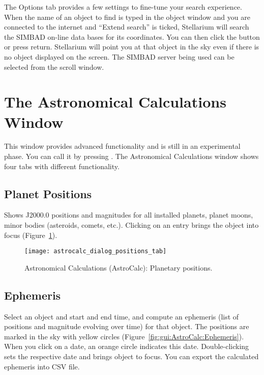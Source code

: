 The Options tab provides a few settings to fine-tune your search experience.
When the name of an object to find is typed in the object
window and you are connected to the internet and ``Extend search'' is
ticked, Stellarium will search the SIMBAD on-line  data bases for its
coordinates. You can then click the  button or press return.
Stellarium will point you at that object in the sky even if there is no
object displayed on the screen. The SIMBAD server being used can be
selected from the scroll window.


\section{The Astronomical Calculations Window}
\label{sec:gui:AstroCalc}

 This window provides advanced functionality and is
still in an experimental phase. You can call it by pressing . The Astronomical Calculations window shows four tabs with different functionality.


\subsection{Planet Positions}
\label{sec:gui:AstroCalc:Positions}

Shows J2000.0 positions and magnitudes for all installed planets, planet moons, minor bodies (asteroids, comets, etc.). Clicking on an entry brings the object into focus (Figure~\ref{fig:gui:AstroCalc:Positions}).


\begin{figure}[htbp]
\centering\texttt{[image: astrocalc\_dialog\_positions\_tab]}
\caption{Astronomical Calculations (AstroCalc): Planetary positions.}
\label{fig:gui:AstroCalc:Positions}
\end{figure}

\subsection{Ephemeris}
\label{sec:gui:AstroCalc:Ephemeris}

Select an object and start and end time, and compute an ephemeris (list of positions and magnitude evolving over time) for that object. The positions are marked in the sky with yellow circles (Figure~\ref{fig:gui:AstroCalc:Ephemeris}). When you click on a date, an orange circle indicates this date. Double-clicking sets the respective date and brings object to focus. You can export the calculated ephemeris into CSV file. 

